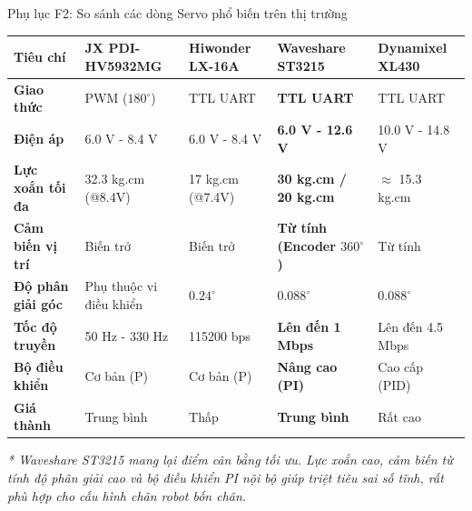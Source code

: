 \documentclass[10pt,aspectratio=169]{beamer}
\begin{document}
\begin{frame}{Phụ lục F2: So sánh các dòng Servo phổ biến trên thị trường}
  \begin{table}[htbp]
      \centering
      \scriptsize
      \def\arraystretch{1.3}
      \begin{tabular}{p{1.8cm} p{2.2cm} p{2.2cm} p{3cm} p{2.5cm}}
          \toprule
          \textbf{Tiêu chí} & \textbf{JX PDI-HV5932MG} & \textbf{Hiwonder LX-16A} & \textbf{\textcolor{hcmutred}{Waveshare ST3215}} & \textbf{Dynamixel XL430} \\
          \midrule
          \textbf{Giao thức} & PWM ($180^\circ$) & TTL UART & \textbf{TTL UART} & TTL UART \\
          \textbf{Điện áp} & 6.0 V - 8.4 V & 6.0 V - 8.4 V & \textbf{6.0 V - 12.6 V} & 10.0 V - 14.8 V \\
          \textbf{Lực xoắn tối đa} & 32.3 kg.cm (@8.4V) & 17 kg.cm (@7.4V) & \textbf{30 kg.cm / 20 kg.cm} & $\approx$ 15.3 kg.cm \\
          \textbf{Cảm biến vị trí} & Biến trở & Biến trở & \textbf{Từ tính (Encoder $360^\circ$)} & Từ tính \\
          \textbf{Độ phân giải góc} & Phụ thuộc vi điều khiển & $0.24^\circ$ & \textbf{$0.088^\circ$} & $0.088^\circ$ \\
          \textbf{Tốc độ truyền} & 50 Hz - 330 Hz & 115200 bps & \textbf{Lên đến 1 Mbps} & Lên đến 4.5 Mbps \\
          \textbf{Bộ điều khiển} & Cơ bản (P) & Cơ bản (P) & \textbf{Nâng cao (PI)} & Cao cấp (PID) \\
          \textbf{Giá thành} & Trung bình & Thấp & \textbf{Trung bình} & Rất cao \\
          \bottomrule
      \end{tabular}
  \end{table}
  \vspace{0.1cm}
  {\small \textit{* Waveshare ST3215 mang lại điểm cân bằng tối ưu. Lực xoắn cao, cảm biến từ tính độ phân giải cao và bộ điều khiển PI nội bộ giúp triệt tiêu sai số tĩnh, rất phù hợp cho cấu hình chân robot bốn chân.}}
\end{frame}
\end{document}
